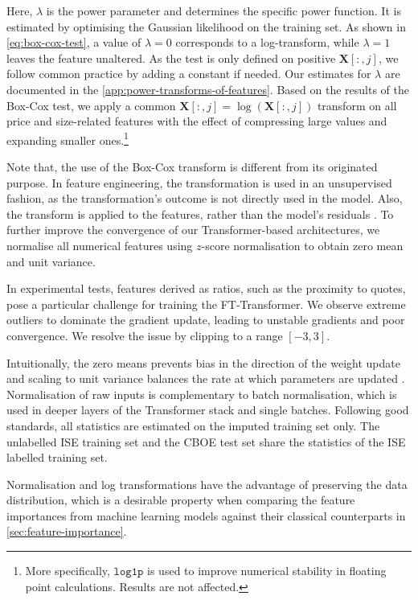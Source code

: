 Here, $\lambda$ is the power parameter and determines the specific power function. It is estimated by optimising the Gaussian likelihood on the training set. As shown in \cref{eq:box-cox-test}, a value of $\lambda=0$ corresponds to a log-transform, while $\lambda=1$ leaves the feature unaltered. As the test is only defined on positive $\mathbf{X}\left[:,j\right]$, we follow common practice by adding a constant if needed. Our estimates for $\lambda$ are documented in the \cref{app:power-transforms-of-features}. Based on the results of the Box-Cox test, we apply a common $\mathbf{X}\left[:,j\right]=\log(\mathbf{X}\left[:,j\right])$ transform on all price and size-related features with the effect of compressing large values and expanding smaller ones.\footnote{More specifically, $\mathtt{log1p}$ is used to improve numerical stability in floating point calculations. Results are not affected.}

Note that, the use of the Box-Cox transform is different from its originated purpose. In feature engineering, the transformation is used in an unsupervised fashion, as the transformation's outcome is not directly used in the model. Also, the transform is applied to the features, rather than the model's residuals \autocite[122]{kuhnFeatureEngineeringSelection2020}.
To further improve the convergence of our Transformer-based architectures, we normalise all numerical features using $z$-score normalisation to obtain zero mean and unit variance.

In experimental tests, features derived as ratios, such as the proximity to quotes, pose a particular challenge for training the FT-Transformer. We observe extreme outliers to dominate the gradient update, leading to unstable gradients and poor convergence. We resolve the issue by clipping to a range $[-3,3]$.

Intuitionally, the zero means prevents bias in the direction of the weight update and scaling to unit variance balances the rate at which parameters are updated \autocite[][8]{lecunEfficientBackProp2012}. Normalisation of raw inputs is complementary to batch normalisation, which is used in deeper layers of the Transformer stack and single batches. Following good standards, all statistics are estimated on the imputed training set only. The unlabelled \gls{ISE} training set and the \gls{CBOE} test set share the statistics of the \gls{ISE} labelled training set.

Normalisation and log transformations have the advantage of preserving the data distribution, which is a desirable property when comparing the feature importances from machine learning models against their classical counterparts in \cref{sec:feature-importance}.


